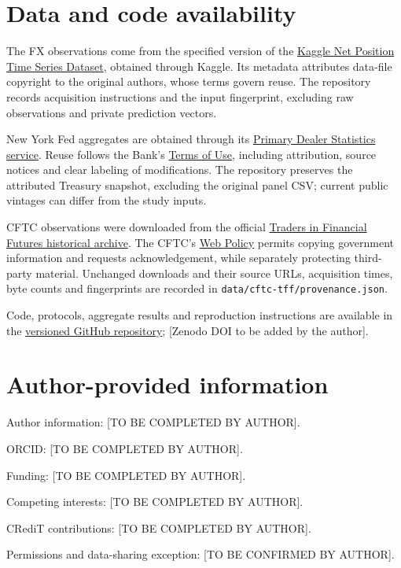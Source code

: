 \documentclass{rQUF2e}
\begin{document}
\FloatBarrier

\section*{Data and code availability}
The FX observations come from the specified version of the \href{https://www.kaggle.com/datasets/davidlindsay1979/net-position-time-series-dataset}{Kaggle Net Position Time Series Dataset}, obtained through Kaggle. Its metadata attributes data-file copyright to the original authors, whose terms govern reuse. The repository records acquisition instructions and the input fingerprint, excluding raw observations and private prediction vectors.

New York Fed aggregates are obtained through its \href{https://www.newyorkfed.org/markets/counterparties/primary-dealers-statistics}{Primary Dealer Statistics service}. Reuse follows the Bank's \href{https://www.newyorkfed.org/privacy/termsofuse.html}{Terms of Use}, including attribution, source notices and clear labeling of modifications. The repository preserves the attributed Treasury snapshot, excluding the original panel CSV; current public vintages can differ from the study inputs.

CFTC observations were downloaded from the official \href{https://www.cftc.gov/MarketReports/CommitmentsofTraders/HistoricalCompressed/index.htm}{Traders in Financial Futures historical archive}. The CFTC's \href{https://www.cftc.gov/sites/default/files/cftc/cftcprivacy.htm}{Web Policy} permits copying government information and requests acknowledgement, while separately protecting third-party material. Unchanged downloads and their source URLs, acquisition times, byte counts and fingerprints are recorded in \texttt{data/cftc-tff/provenance.json}.

Code, protocols, aggregate results and reproduction instructions are available in the \href{https://github.com/ByronLi0207/financial-mathematics-paper-20261020/tree/submission-final}{versioned GitHub repository}; [Zenodo DOI to be added by the author].

\section*{Author-provided information}
Author information: [TO BE COMPLETED BY AUTHOR].\par
ORCID: [TO BE COMPLETED BY AUTHOR].\par
Funding: [TO BE COMPLETED BY AUTHOR].\par
Competing interests: [TO BE COMPLETED BY AUTHOR].\par
CRediT contributions: [TO BE COMPLETED BY AUTHOR].\par
Permissions and data-sharing exception: [TO BE CONFIRMED BY AUTHOR].\par



\end{document}
